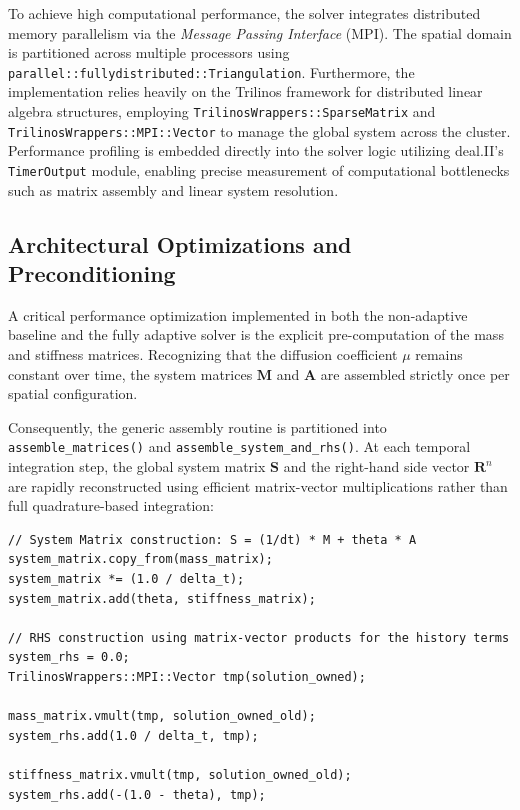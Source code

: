 \documentclass[
  11pt,
]{article}
\begin{document}
To achieve high computational performance, the solver integrates distributed memory parallelism via the \textit{Message Passing Interface} (MPI). The spatial domain is partitioned across multiple processors using \texttt{parallel::fullydistributed::Triangulation}. Furthermore, the implementation relies heavily on the Trilinos framework for distributed linear algebra structures, employing \texttt{TrilinosWrappers::SparseMatrix} and \texttt{TrilinosWrappers::MPI::Vector} to manage the global system across the cluster. Performance profiling is embedded directly into the solver logic utilizing deal.II's \texttt{TimerOutput} module, enabling precise measurement of computational bottlenecks such as matrix assembly and linear system resolution.

\subsection{Architectural Optimizations and Preconditioning}

A critical performance optimization implemented in both the non-adaptive baseline and the fully adaptive solver is the explicit pre-computation of the mass and stiffness matrices. Recognizing that the diffusion coefficient $\mu$ remains constant over time, the system matrices $\mathbf{M}$ and $\mathbf{A}$ are assembled strictly once per spatial configuration. 

Consequently, the generic assembly routine is partitioned into \texttt{assemble\_matrices()} and \texttt{assemble\_system\_and\_rhs()}. At each temporal integration step, the global system matrix $\mathbf{S}$ and the right-hand side vector $\mathbf{R}^n$ are rapidly reconstructed using efficient matrix-vector multiplications rather than full quadrature-based integration:

\begin{verbatim}
// System Matrix construction: S = (1/dt) * M + theta * A
system_matrix.copy_from(mass_matrix);
system_matrix *= (1.0 / delta_t);
system_matrix.add(theta, stiffness_matrix);

// RHS construction using matrix-vector products for the history terms
system_rhs = 0.0;
TrilinosWrappers::MPI::Vector tmp(solution_owned); 

mass_matrix.vmult(tmp, solution_owned_old);
system_rhs.add(1.0 / delta_t, tmp);

stiffness_matrix.vmult(tmp, solution_owned_old);
system_rhs.add(-(1.0 - theta), tmp);
\end{verbatim}
\end{document}
